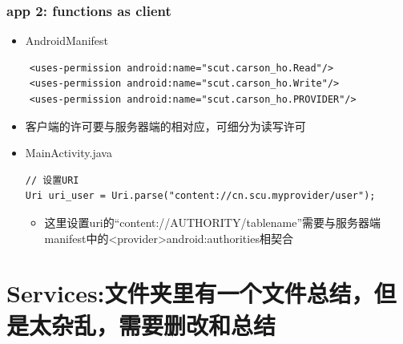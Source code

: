 \documentclass[9pt, b5paaper]{book}
\begin{document}
\subsection{app 2: functions as client}
\label{sec-5-9-2}
\begin{itemize}
\item AndroidManifest
\end{itemize}
\begin{verbatim}
    <uses-permission android:name="scut.carson_ho.Read"/>
    <uses-permission android:name="scut.carson_ho.Write"/>
    <uses-permission android:name="scut.carson_ho.PROVIDER"/>
\end{verbatim}
\begin{itemize}
\item 客户端的许可要与服务器端的相对应，可细分为读写许可
\item MainActivity.java
\begin{verbatim}
// 设置URI
Uri uri_user = Uri.parse("content://cn.scu.myprovider/user");
\end{verbatim}
\begin{itemize}
\item 这里设置uri的“content://AUTHORITY/tablename”需要与服务器端manifest中的<provider>android:authorities相契合
\end{itemize}
\end{itemize}

\chapter{Services:文件夹里有一个文件总结，但是太杂乱，需要删改和总结}
\label{sec-6}
\end{document}
